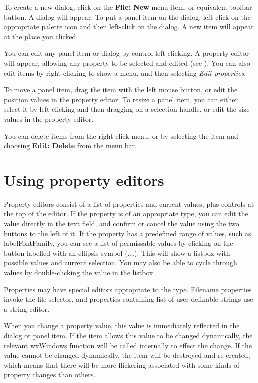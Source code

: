 To create a new dialog, click on the {\bf File: New} menu item, or equivalent
toolbar button. A dialog will appear. To put a panel item on the dialog, left-click
on the appropriate palette icon and then left-click on the dialog. A new item
will appear at the place you clicked.

You can edit any panel item or dialog by control-left clicking. A property editor
will appear, allowing any property to be selected and edited (see ).
You can also edit items by right-clicking to show a menu, and then selecting {\it Edit properties}.

To move a panel item, drag the item with the left mouse button, or edit
the position values in the property editor. To resize a panel item, you
can either select it by left-clicking and then dragging on a selection
handle, or edit the size values in the property editor. 

You can delete items from the right-click menu, or by selecting the item and
choosing {\bf Edit: Delete} from the menu bar.

\section{Using property editors}\label{propeditors}

Property editors consist of a list of properties and current values, plus controls at the top of
the editor. If the property is of an appropriate type, you can edit the value directly in the
text field, and confirm or cancel the value using the two buttons to the left of it.
If the property has a predefined range of values, such as labelFontFamily, you can
see a list of permissable values by clicking on the button labelled with an ellipsis symbol ({\bf ...}).
This will show a listbox with possible values and current selection. You may also be able
to cycle through values by double-clicking the value in the listbox.

Properties may have special editors appropriate to the type. Filename properties invoke
the file selector, and properties containing list of user-definable strings use a
string editor.

When you change a property value, this value is immediately reflected in
the dialog or panel item.  If the item allows this value to be changed
dynamically, the relevant wxWindows function will be called internally
to effect the change.  If the value cannot be changed dynamically, the
item will be destroyed and re-created, which means that there will be
more flickering associated with some kinds of property changes than
others.

